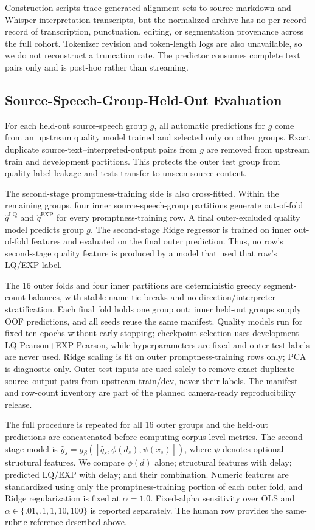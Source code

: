 Construction scripts trace generated alignment sets to source markdown and Whisper interpretation transcripts, but the normalized archive has no per-record record of transcription, punctuation, editing, or segmentation provenance across the full cohort. Tokenizer revision and token-length logs are also unavailable, so we do not reconstruct a truncation rate. The predictor consumes complete text pairs only and is post-hoc rather than streaming.

\subsection{Source-Speech-Group-Held-Out Evaluation}
For each held-out source-speech group $g$, all automatic predictions for $g$ come from an upstream quality model trained and selected only on other groups. Exact duplicate source-text--interpreted-output pairs from $g$ are removed from upstream train and development partitions. This protects the outer test group from quality-label leakage and tests transfer to unseen source content.

The second-stage promptness-training side is also cross-fitted. Within the remaining groups, four inner source-speech-group partitions generate out-of-fold $\hat q^{\mathrm{LQ}}$ and $\hat q^{\mathrm{EXP}}$ for every promptness-training row. A final outer-excluded quality model predicts group $g$. The second-stage Ridge regressor is trained on inner out-of-fold features and evaluated on the final outer prediction. Thus, no row's second-stage quality feature is produced by a model that used that row's LQ/EXP label.

The 16 outer folds and four inner partitions are deterministic greedy segment-count balances, with stable name tie-breaks and no direction/interpreter stratification. Each final fold holds one group out; inner held-out groups supply OOF predictions, and all seeds reuse the same manifest. Quality models run for fixed ten epochs without early stopping; checkpoint selection uses development LQ Pearson+EXP Pearson, while hyperparameters are fixed and outer-test labels are never used. Ridge scaling is fit on outer promptness-training rows only; PCA is diagnostic only. Outer test inputs are used solely to remove exact duplicate source--output pairs from upstream train/dev, never their labels. The manifest and row-count inventory are part of the planned camera-ready reproducibility release.

The full procedure is repeated for all 16 outer groups and the held-out predictions are concatenated before computing corpus-level metrics. The second-stage model is $\hat y_s=g_\beta([\hat q_s,\phi(d_s),\psi(x_s)])$, where $\psi$ denotes optional structural features. We compare $\phi(d)$ alone; structural features with delay; predicted LQ/EXP with delay; and their combination. Numeric features are standardized using only the promptness-training portion of each outer fold, and Ridge regularization is fixed at $\alpha=1.0$. Fixed-alpha sensitivity over OLS and $\alpha\in\{.01,.1,1,10,100\}$ is reported separately. The human row provides the same-rubric reference described above.

